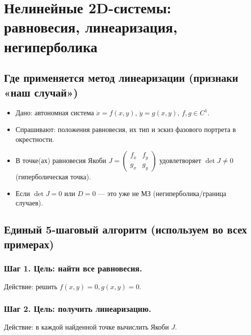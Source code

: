 \section{Нелинейные 2D-системы: равновесия, линеаризация, негиперболика}\label{sec:nonlinear-2d-systems}


\subsection{Где применяется метод линеаризации (признаки «наш случай»)}
\begin{itemize}
    \item Дано: автономная система $\dot{x} = f(x, y)$, $\dot{y} = g(x,y)$, $f, g \in C^1$.
    \item Спрашивают: положения равновесия, их тип и эскиз фазового портрета в окрестности.
    \item В точке(ах) равновесия Якоби $J = \begin{pmatrix} f_x & f_y \\ g_x & g_y \end{pmatrix}$ удовлетворяет $\det J \neq 0$ (гиперболическая точка).
    \item Если $\det J = 0$ или $D = 0$ --- это уже не МЗ (негиперболика/граница случаев).
\end{itemize}

\subsection{Единый 5-шаговый алгоритм (используем во всех примерах)}

\subsubsection{Шаг 1. Цель: найти все равновесия.}
Действие: решить $f(x, y) = 0, g(x, y) = 0$.

\subsubsection{Шаг 2. Цель: получить линеаризацию.}
Действие: в каждой найденной точке вычислить Якоби $J$.

